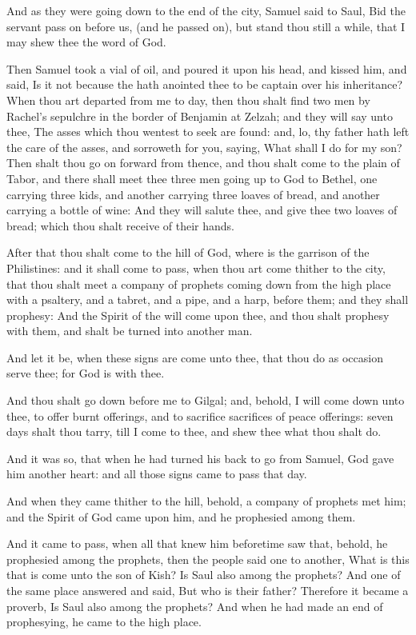 \Verse And as they were going down to the end of the city, Samuel said to Saul, Bid the servant pass on before us, (and he passed on), but stand thou still a while, that I may shew thee the word of God.


\Chapter
\Verse Then Samuel took a vial of oil, and poured it upon his head, and kissed him, and said, Is it not because the \LORD hath anointed thee to be captain over his inheritance?  \Verse When thou art departed from me to day, then thou shalt find two men by Rachel's sepulchre in the border of Benjamin at Zelzah; and they will say unto thee, The asses which thou wentest to seek are found: and, lo, thy father hath left the care of the asses, and sorroweth for you, saying, What shall I do for my son?  \Verse Then shalt thou go on forward from thence, and thou shalt come to the plain of Tabor, and there shall meet thee three men going up to God to Bethel, one carrying three kids, and another carrying three loaves of bread, and another carrying a bottle of wine: \Verse And they will salute thee, and give thee two loaves of bread; which thou shalt receive of their hands.

\Verse After that thou shalt come to the hill of God, where is the garrison of the Philistines: and it shall come to pass, when thou art come thither to the city, that thou shalt meet a company of prophets coming down from the high place with a psaltery, and a tabret, and a pipe, and a harp, before them; and they shall prophesy: \Verse And the Spirit of the \LORD will come upon thee, and thou shalt prophesy with them, and shalt be turned into another man.

\Verse And let it be, when these signs are come unto thee, that thou do as occasion serve thee; for God is with thee.

\Verse And thou shalt go down before me to Gilgal; and, behold, I will come down unto thee, to offer burnt offerings, and to sacrifice sacrifices of peace offerings: seven days shalt thou tarry, till I come to thee, and shew thee what thou shalt do.

\Verse And it was so, that when he had turned his back to go from Samuel, God gave him another heart: and all those signs came to pass that day.

\Verse And when they came thither to the hill, behold, a company of prophets met him; and the Spirit of God came upon him, and he prophesied among them.

\Verse And it came to pass, when all that knew him beforetime saw that, behold, he prophesied among the prophets, then the people said one to another, What is this that is come unto the son of Kish? Is Saul also among the prophets?  \Verse And one of the same place answered and said, But who is their father? Therefore it became a proverb, Is Saul also among the prophets?  \Verse And when he had made an end of prophesying, he came to the high place.

